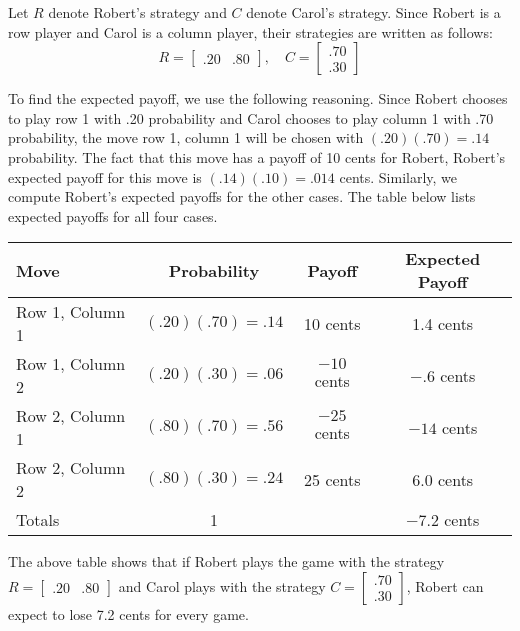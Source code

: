 \begin{solution}
    Let \( R \) denote Robert's strategy and \( C \) denote Carol's strategy. Since Robert is a row player and Carol is a column player, their strategies are written as follows:
    \[ R = \begin{bmatrix} .20 & .80 \end{bmatrix}, \quad C = \begin{bmatrix} .70 \\ .30 \end{bmatrix} \]

    To find the expected payoff, we use the following reasoning.
    Since Robert chooses to play row 1 with .20 probability and Carol chooses to play column 1 with .70 probability, the move row 1, column 1 will be chosen with \((.20)(.70) = .14\) probability. The fact that this move has a payoff of 10 cents for Robert, Robert's expected payoff for this move is \((.14)(.10) = .014\) cents. Similarly, we compute Robert's expected payoffs for the other cases. The table below lists expected payoffs for all four cases.

    \begin{center}
        \begin{tabular}{|l|c|c|c|}
            \hline
            Move            & Probability          & Payoff        & Expected Payoff \\
            \hline
            Row 1, Column 1 & \((.20)(.70) = .14\) & 10 cents      & 1.4 cents       \\
            Row 1, Column 2 & \((.20)(.30) = .06\) & \(-10\) cents & \(-.6\) cents   \\
            Row 2, Column 1 & \((.80)(.70) = .56\) & \(-25\) cents & \(-14\) cents   \\
            Row 2, Column 2 & \((.80)(.30) = .24\) & 25 cents      & 6.0 cents       \\
            \hline
            Totals          & 1                    &               & \(-7.2\) cents  \\
            \hline
        \end{tabular}
    \end{center}

    The above table shows that if Robert plays the game with the strategy \( R = \begin{bmatrix} .20 & .80 \end{bmatrix} \) and Carol plays with the strategy \( C = \begin{bmatrix} .70 \\ .30 \end{bmatrix} \), Robert can expect to lose 7.2 cents for every game.


\end{solution}
